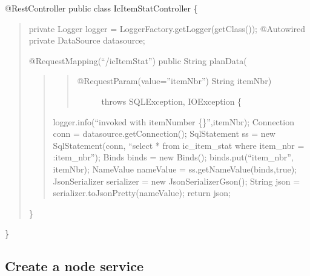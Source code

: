 \documentclass[letterpaper,10pt,english]{sphinxmanual}
\begin{document}
@RestController
public class IcItemStatController \{
\begin{quote}

private Logger logger = LoggerFactory.getLogger(getClass());
@Autowired
private DataSource datasource;

@RequestMapping(“/icItemStat”)
public String  planData(
\begin{quote}
\begin{quote}
\begin{description}
\item[{@RequestParam(value=”itemNbr”) String itemNbr)}] \leavevmode
throws SQLException, IOException \{

\end{description}
\end{quote}

logger.info(“invoked with itemNumber \{\}”,itemNbr);
Connection conn = datasource.getConnection();
SqlStatement ss = new SqlStatement(conn, “select * from ic\_item\_stat where item\_nbr = :item\_nbr”);
Binds binds = new Binds();
binds.put(“item\_nbr”, itemNbr);
NameValue nameValue = ss.getNameValue(binds,true);
JsonSerializer serializer = new JsonSerializerGson();
String json = serializer.toJsonPretty(nameValue);
return json;
\end{quote}

\}
\end{quote}

\}


\subsection{Create a node service}
\label{\detokenize{IcItemStat:create-a-node-service}}
\begin{sphinxVerbatim}[commandchars=\\\{\}]
     
     
 \PYG{p}{[}\PYG{p}{]} 
      \PYG{p}{[}\PYG{p}{]}    
\end{sphinxVerbatim}
\end{document}
